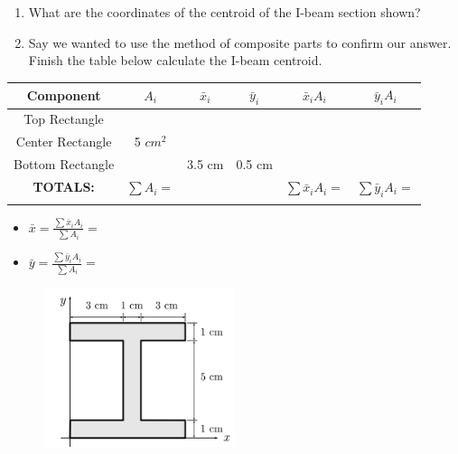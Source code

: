 
\begin{enumerate}
  \item What are the coordinates of the centroid of the I-beam section shown?
  \item Say we wanted to use the method of composite parts to confirm our answer.  Finish the table below calculate the I-beam centroid.
\end{enumerate}

\begin{center}
\begin{tabular}{ |c|c|c|c|c|c| } 
  \hline
  \textbf{Component} & $A_i$ & $\bar{x}_i$ & $\bar{y}_i$ & $\bar{x}_i A_i$ & $\bar{y}_i A_i$ \\\hline 
  Top Rectangle & & & & & \\\hline
  Center Rectangle & 5 $cm^2$ & & & & \\\hline
  Bottom Rectangle &  & 3.5 cm & 0.5 cm & &   \\\hline
  \textbf{TOTALS:} & $\sum A_i = $ & & & $\sum \bar{x}_i A_i = $ & $\sum \bar{y}_i A_i = $ \\
  &&&&&\\\hline
\end{tabular}
\end{center}

\begin{itemize}
  \item $\bar{x} = \frac{\sum \bar{x}_i A_i}{\sum A_i} = $
  \item $\bar{y} = \frac{\sum \bar{y}_i A_i}{\sum A_i} = $
\end{itemize}


\begin{figure}[ht!]
  \centering
  \includegraphics[width=0.5\textwidth,height=0.5\textheight,keepaspectratio]{fig.png}
\end{figure}


